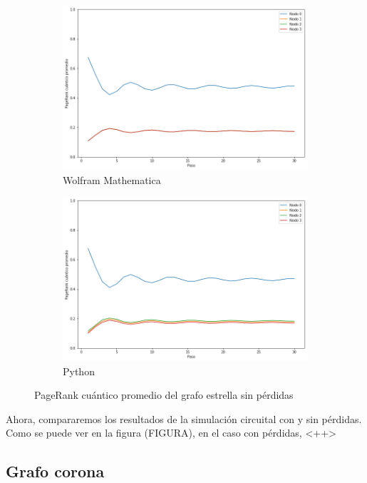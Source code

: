\begin{figure}[H]
    \centering
    \begin{subfigure}[m]{0.45\textwidth}
        \centering
        \includegraphics[width=0.9\linewidth]{img/star-mean-M.png}
        \caption{Wolfram Mathematica}
    \end{subfigure}
    \begin{subfigure}[m]{0.45\textwidth}
        \centering
        \includegraphics[width=0.9\linewidth]{img/star-mean-lossless.png}
        \caption{Python}
    \end{subfigure}
    \caption[PageRank cuántico promedio del grafo estrella sin pérdidas]{PageRank cuántico promedio del grafo estrella sin pérdidas}
    \label{fig:meanstarlossless}
\end{figure}

Ahora, compararemos los resultados de la simulación circuital con y sin pérdidas. Como se puede ver en la figura (FIGURA), en el caso con pérdidas, <++>

\subsection{Grafo corona}

